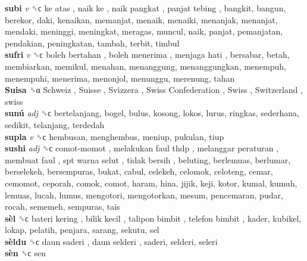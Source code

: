 \textbf{subi} \emph{v}  ␝ϲ   ke atas ,  naik ke ,  naik pangkat ,  panjat tebing , bangkit, bangun, berekor, daki, kenaikan, memanjat, menaik, menaiki, menanjak, menanjat, mendaki, meninggi, meningkat, meragas, muncul, naik, panjat, pemanjatan, pendakian, peningkatan, tambah, terbit, timbul  \\
\textbf{sufri} \emph{v}  ␝ϲ   boleh bertahan ,  boleh menerima ,  menjaga hati , bersabar, betah, membiarkan, memikul, menahan, menanggung, menanggungkan, menempuh, menempuhi, menerima, menonjol, menunggu, merenung, tahan  \\
\textbf{Suisa} ␝α   Schweiz ,  Suisse ,  Svizzera ,  Swiss Confederation ,  Swiss ,  Switzerland , swiss  \\
\textbf{sunú} \emph{adj}  ␝ϲ  bertelanjang, bogel, bulus, kosong, lokos, lurus, ringkas, sederhana, sedikit, telanjang, terdedah  \\
\textbf{supla} \emph{v}  ␝ϲ  hembusan, menghembus, meniup, pukulan, tiup  \\
\textbf{sushi} \emph{adj}  ␝ϲ   comot-momot ,  melakukan faul thdp ,  melanggar peraturan ,  membuat faul ,  spt warna selut ,  tidak bersih , beluting, berlemuas, berlumar, berselekeh, bersempuras, bukat, cabul, celekeh, celomok, celoteng, cemar, cemomot, ceporah, comok, comot, haram, hina, jijik, keji, kotor, kumal, kumuh, lemuas, lucah, lumus, mengotori, mengotorkan, mesum, pencemaran, pudar, rocah, sememeh, sempuras, tais  \\
\textbf{sèl} ␝ϲ   bateri kering ,  bilik kecil ,  talipon bimbit ,  telefon bimbit , kader, kubikel, lokap, pelatih, penjara, sarang, sekutu, sel  \\
\textbf{sèldu} ␝ϲ   daun saderi ,  daun selderi , saderi, selderi, seleri  \\
\textbf{sèn} ␝ϲ  sen  \\
